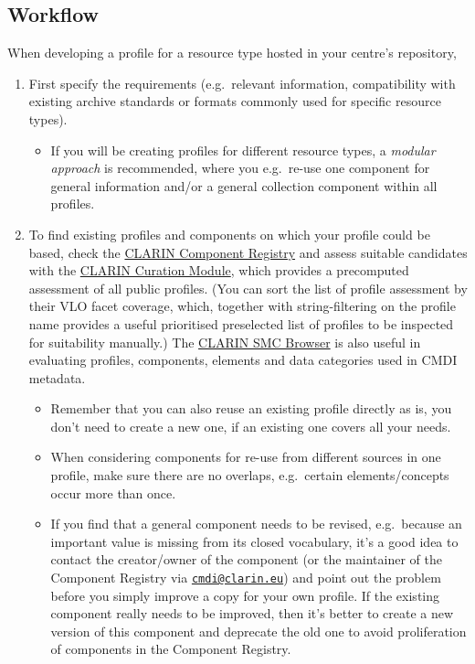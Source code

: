 \subsection{Workflow}\label{modelling-workflow}

When developing a profile for a resource type hosted in your centre's repository,

\begin{enumerate}
\def\labelenumi{\arabic{enumi}.}
\tightlist
\item
  First specify the requirements (e.g.~relevant information,
  compatibility with existing archive standards or formats commonly used for specific resource types).
\begin{itemize}
\tightlist
\item
  If you will be creating profiles for different resource types, a \emph{modular approach} is recommended, where you e.g.~re-use one component for general information and/or a general collection component within all profiles.
\end{itemize}

\item
  To find existing profiles and components on which your profile could be based, check the   \href{https://catalog.clarin.eu/ds/ComponentRegistry}{CLARIN Component Registry} and assess suitable candidates with the
  \href{https://clarin.oeaw.ac.at/curate/}{CLARIN Curation Module}, which provides a precomputed assessment of all public profiles. (You can sort the list of profile assessment by their VLO facet coverage, which, together with string-filtering on the profile name provides a useful prioritised preselected list of profiles to be inspected for
  suitability manually.) The   \href{https://clarin.oeaw.ac.at/smc-browser/index.html}{CLARIN SMC Browser} is also useful in evaluating profiles, components, elements and data categories used in CMDI metadata.

\begin{itemize}
\tightlist
\item
  Remember that you can also reuse an existing profile directly as is, you don't need to create a new one, if an existing one covers all your needs.
\item
  When considering components for re-use from different sources in one profile, make sure there are no overlaps, e.g.~certain
  elements/concepts occur more than once.
\item
  If you find that a general component needs to be revised, e.g.~because an important value is missing from its closed vocabulary, it's a good idea to contact the creator/owner of the component (or the maintainer of the Component Registry via
  \href{mailto:cmdi@clarin.eu}{\nolinkurl{cmdi@clarin.eu}}) and point out the problem before you simply improve a copy for your own profile. If the existing component really needs to be improved, then it's better to create a new version of this component and deprecate the old one to avoid proliferation of components in the Component Registry.
\end{itemize}


\end{enumerate}
